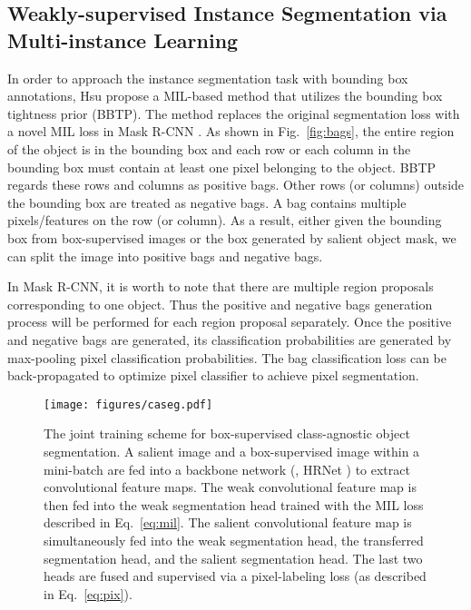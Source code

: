 \documentclass[final]{cvpr}
\begin{document}
\subsection{Weakly-supervised Instance Segmentation via Multi-instance Learning}
\label{sec:bbtp}



In order to approach the instance segmentation task with bounding box annotations, Hsu \etal \cite{hsu2019weakly} propose a MIL-based method that utilizes the bounding box tightness prior (BBTP). The method replaces the original segmentation loss with a novel MIL loss in Mask R-CNN \cite{he2017mask}. 
As shown in Fig.~\ref{fig:bags}, the entire region of the object is in the bounding box and each row or each column in the bounding box must contain at least one pixel belonging to the object. BBTP regards these rows and columns as positive bags. Other rows (or columns) outside the bounding box are treated as negative bags. A bag contains multiple pixels/features on the row (or column). As a result, either given the bounding box from box-supervised images or the box generated by salient object mask, we can split the image into positive bags and negative bags. 

In Mask R-CNN, it is worth to note that there are multiple region proposals corresponding to one object. Thus the positive and negative bags generation process will be performed for each region proposal separately. Once the positive and negative bags are generated, its classification probabilities are generated by max-pooling pixel classification probabilities. The bag classification loss can be back-propagated to optimize pixel classifier to achieve pixel segmentation.







\begin{figure*}[ht]
\centering
\texttt{[image: figures/caseg.pdf]}
\caption{The joint training scheme for box-supervised class-agnostic object segmentation. A salient image and a box-supervised image within a mini-batch are fed into a backbone network (\ie, HRNet \cite{wang2020deep}) to extract convolutional feature maps. The weak convolutional feature map is then fed into the weak segmentation head trained with the MIL loss described in Eq.~\eqref{eq:mil}. The salient convolutional feature map is simultaneously fed into the weak segmentation head, the transferred segmentation head, and the salient segmentation head. The last two heads are fused and supervised via a pixel-labeling loss (as described in Eq.~\eqref{eq:pix}).}
\label{fig:caseg}
\end{figure*}
\end{document}
